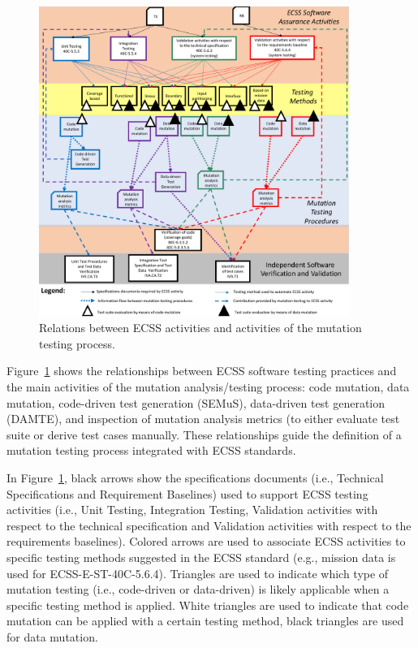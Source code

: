 \begin{figure}[h]
  \centering
    \includegraphics[width=0.9\textwidth]{images/ECSSTesting}
      \caption{Relations between ECSS activities and activities of the mutation testing process.}
      \label{fig:ECSSTesting}
\end{figure}

Figure~\ref{fig:ECSSTesting} shows the relationships between ECSS software testing practices and the main activities of the mutation analysis/testing process: code mutation, data mutation, code-driven test generation (SEMuS), data-driven test generation (DAMTE), and inspection of mutation analysis metrics (to either evaluate test suite or derive test cases manually. These relationships guide the definition of a mutation testing process integrated with ECSS standards.
 
In Figure~\ref{fig:ECSSTesting}, black arrows show the specifications documents (i.e., Technical Specifications and Requirement Baselines) used to support ECSS testing activities (i.e., Unit Testing, Integration Testing, Validation activities with respect to the technical specification and Validation activities with respect to the requirements baselines). Colored arrows are used to associate ECSS activities to specific testing methods suggested in the ECSS standard (e.g., mission data is used for ECSS-E-ST-40C-5.6.4). Triangles are used to indicate which type of mutation testing (i.e., code-driven or data-driven) is likely applicable when a specific testing method is applied. White triangles are used to indicate that code mutation can be applied with a certain testing method, black triangles are used for data mutation. 


